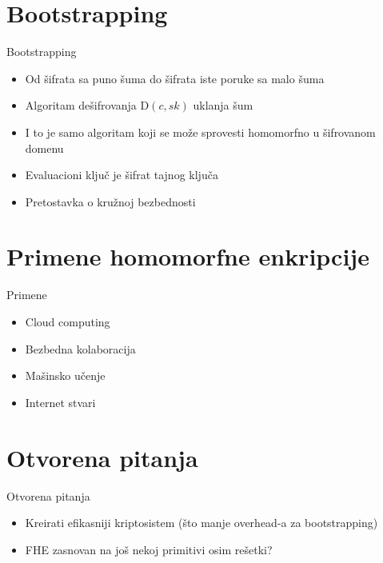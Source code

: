 \documentclass[aspectratio=1610]{beamer}
\begin{document}
\section{Bootstrapping}
\begin{frame}{Bootstrapping}
    \begin{itemize}
        \item Od \v sifrata sa puno \v suma do \v sifrata iste poruke sa malo \v suma
        \item Algoritam de\v sifrovanja $\mathrm{D}(c, sk)$ uklanja \v sum
        \item I to je samo algoritam koji se mo\v ze sprovesti homomorfno u \v sifrovanom domenu
        \item Evaluacioni klju\v c je \v sifrat tajnog klju\v ca
        \item Pretostavka o kru\v znoj bezbednosti
    \end{itemize}
\end{frame}

\section{Primene homomorfne enkripcije}
\begin{frame}{Primene}
    \begin{itemize}
        \item Cloud computing
        \item Bezbedna kolaboracija
        \item Ma\v sinsko u\v cenje
        \item Internet stvari
    \end{itemize}
\end{frame}

\section{Otvorena pitanja}
\begin{frame}{Otvorena pitanja}
\begin{itemize}
    \item Kreirati efikasniji kriptosistem (\v sto manje overhead-a za bootstrapping)
    \item FHE zasnovan na jo\v s nekoj primitivi osim re\v setki?
\end{itemize}
\end{frame}
\end{document}
